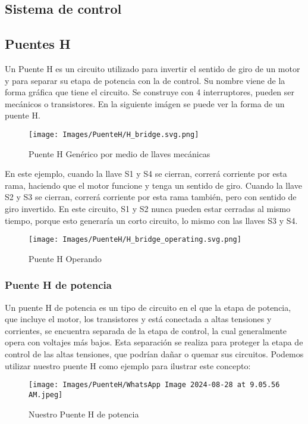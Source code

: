 \documentclass{article}
\begin{document}
\subsection{Sistema de control}

\subsection{Puentes H}
Un Puente H es un circuito utilizado para invertir el sentido de giro de un motor y para separar su etapa de potencia con la de control. Su nombre viene de la forma gráfica que tiene el circuito. Se construye con 4 interruptores, pueden ser mecánicos o transistores. En la siguiente imágen se puede ver la forma de un puente H.

\begin{figure}[H]
    \centering
    \texttt{[image: Images/PuenteH/H\_bridge.svg.png]}
    \caption{Puente H Genérico por medio de llaves mecánicas}
\end{figure}

En este ejemplo, cuando la llave S1 y S4 se cierran, correrá corriente por esta rama, haciendo que el motor funcione y tenga un sentido de giro. Cuando la llave S2 y S3 se cierran, correrá corriente por esta rama también, pero con sentido de giro invertido. En este circuito, S1 y S2 nunca pueden estar cerradas al mismo tiempo, porque esto generaría un corto circuito, lo mismo con las llaves S3 y S4.

\begin{figure}[H]
    \centering
    \texttt{[image: Images/PuenteH/H\_bridge\_operating.svg.png]}
    \caption{Puente H Operando}
\end{figure}

\subsubsection{Puente H de potencia}
Un puente H de potencia es un tipo de circuito en el que la etapa de potencia, que incluye el motor, los transistores y está conectada a altas tensiones y corrientes, se encuentra separada de la etapa de control, la cual generalmente opera con voltajes más bajos. Esta separación se realiza para proteger la etapa de control de las altas tensiones, que podrían dañar o quemar sus circuitos. Podemos utilizar nuestro puente H como ejemplo para ilustrar este concepto:

 \begin{figure}[H]
     \centering
     \texttt{[image: Images/PuenteH/WhatsApp Image 2024-08-28 at 9.05.56 AM.jpeg]}
     \caption{Nuestro Puente H de potencia}
     \label{fig:enter-label}
 \end{figure}
\end{document}
